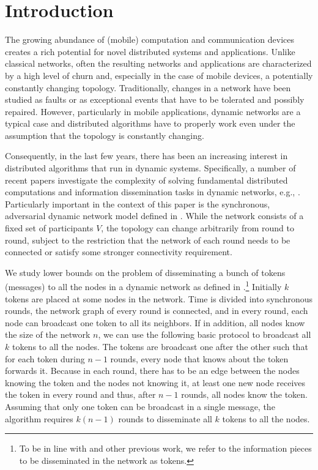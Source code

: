\documentclass{llncs}
\begin{document}
\section{Introduction}

The growing abundance of (mobile) computation and communication
devices creates a rich potential for novel distributed systems and
applications. Unlike classical networks, often the resulting networks
and applications are characterized by a high level of churn and,
especially in the case of mobile devices, a potentially constantly
changing topology. Traditionally, changes in a network have been
studied as faults or as exceptional events that have to be tolerated
and possibly repaired. However, particularly in mobile applications,
dynamic networks are a typical case and distributed algorithms
have to properly work even under the assumption that the topology is constantly changing.

Consequently, in the last few years, there has been an increasing
interest in distributed algorithms that run in dynamic
systems. Specifically, a number of recent papers investigate the
complexity of solving fundamental distributed computations and
information dissemination tasks in dynamic networks, e.g.,
\cite{avin08,baumann09,clementi08,clementi09,cornejo12,LBarxiv,odell05,HK,KLO,KMO,KOSurvey}.
Particularly important in the context of this paper is the
synchronous, adversarial dynamic network model defined in
\cite{KLO}. While the network consists of a fixed set of participants
$V$, the topology can change arbitrarily from round to round, subject
to the restriction that the network of each round needs to be
connected or satisfy some stronger connectivity requirement.

We study lower bounds on the problem of disseminating a
bunch of tokens (messages) to all the nodes in a dynamic network as
defined in \cite{KLO}.\footnote{To be in line with \cite{KLO} and
    other previous work, we refer to the information pieces to be
    disseminated in the network as tokens.} Initially $k$ tokens are
placed at some nodes in the network. 
Time is divided into
synchronous rounds, the network graph of every round is connected, and
in every round, each node can broadcast one token to all its
neighbors. If in addition, all nodes know the size of the network $n$,
we can use the following basic protocol to broadcast all $k$ tokens to
all the nodes. The tokens are broadcast one after the other such that
for each token during $n-1$ rounds, every node that knows about the
token forwards it. Because in each round, there has to be an edge
between the nodes knowing the token and the nodes not knowing it, at
least one new node receives the token in every round and thus, after
$n-1$ rounds, all nodes know the token. Assuming that only one token
can be broadcast in a single message, the algorithm requires $k(n-1)$
rounds to disseminate all $k$ tokens to all the nodes.
\end{document}
